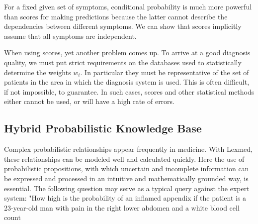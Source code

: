 \documentclass[10pt]{book}
\begin{document}
For a fixed given set of symptoms, conditional probability is much more powerful than scores for making predictions because the latter cannot describe the dependencies between different symptoms. We can show that scores implicitly assume that all symptoms are independent.

When using scores, yet another problem comes up. To arrive at a good diagnosis quality, we must put strict requirements on the databases used to statistically determine the weights $w_{i}$. In particular they must be representative of the set of patients in the area in which the diagnosis system is used. This is often difficult, if not impossible, to guarantee. In such cases, scores and other statistical methods either cannot be used, or will have a high rate of errors.

\subsection{Hybrid Probabilistic Knowledge Base}
Complex probabilistic relationships appear frequently in medicine. With Lexmed, these relationships can be modeled well and calculated quickly. Here the use of probabilistic propositions, with which uncertain and incomplete information can be expressed and processed in an intuitive and mathematically grounded way, is essential. The following question may serve as a typical query against the expert system: "How high is the probability of an inflamed appendix if the patient is a 23-year-old man with pain in the right lower abdomen and a white blood cell count
\end{document}
